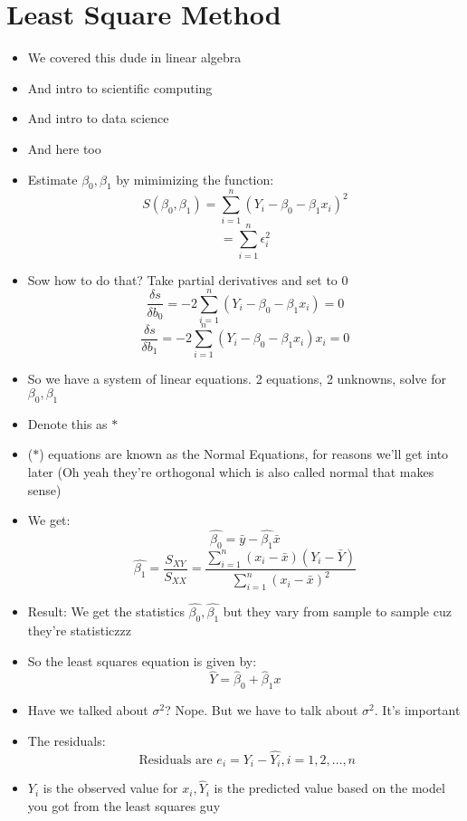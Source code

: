 \documentclass{article}
\begin{document}
  \section*{Least Square Method}
  \begin{itemize}
    \item We covered this dude in linear algebra
    \item And intro to scientific computing
    \item And intro to data science
    \item And here too
    \item Estimate $ \beta_0, \beta_1 $ by mimimizing the function:
      \[
        S(\beta_0, \beta_1) = \sum_{i = 1}^{n}{(Y_i - \beta_0 - \beta_1 x_i)}^2
      \] 
      \[
        = \sum_{i = 1}^{n} \epsilon_i^2
      \] 
    \item Sow how to do that? Take partial derivatives and set to 0
      \[
        \frac{\delta s}{\delta b_0} = -2 \sum_{i = 1}^{n} (Y_i - \beta_0 - \beta_1 x_i) = 0
      \] 
      \[
        \frac{\delta s}{\delta b_1} = -2 \sum_{i = 1}^{n} (Y_i - \beta_0 - \beta_1 x_i) x_i = 0
      \] 
    \item So we have a system of linear equations. 2 equations, 2 unknowns, solve for $ \beta_0, \beta_1 $
    \item Denote this as  $ * $
    \item ($*$) equations are known as the Normal Equations, for reasons we'll get into later (Oh yeah they're orthogonal which is also called normal that makes sense)
    \item We get:  \[
        \hat{\beta_0} = \bar{y} - \hat{\beta_1} \bar{x}
    \] 
    \[
      \hat{\beta_1} = \frac{S_{XY}}{S_{XX}}
      = 
    \frac{ \sum_{i = 1}^{n} (x_i - \bar{x}) (Y_i - \bar{Y})}{ \sum_{i = 1}^{n} {(x_i - \bar{x})}^2}
    \] 
  \item Result: We get the statistics $ \hat{\beta_0}, \hat{\beta_1} $ but they vary from sample to sample cuz they're statisticzzz
  \item So the least squares equation is given by:
    \[
    \hat{Y} = \hat{\beta}_0 + \hat{\beta}_1x
    \] 
  \item Have we talked about $\sigma^2$? Nope. But we have to talk about $ \sigma^2 $. It's important
  \item The residuals:
    \[
      \text{ Residuals are } e_i = Y_i - \hat{Y_i}, i = 1, 2, \ldots, n
    \] 
  \item $ Y_i $ is the observed value for  $ x_i, \hat{Y}_i $ is the predicted value based on the model you got from the least squares guy

\end{itemize}
\end{document}
